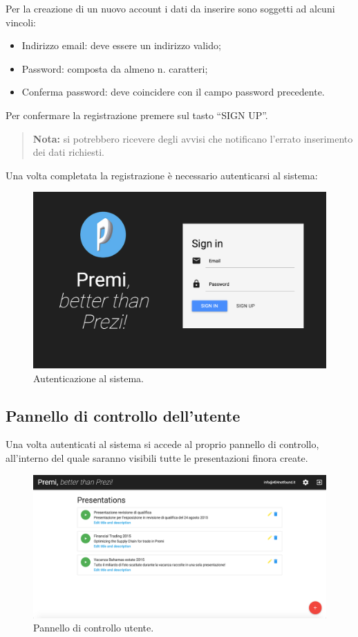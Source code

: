 Per la creazione di un nuovo account i dati da inserire sono soggetti ad alcuni vincoli:
\begin{itemize}
\item Indirizzo email: deve essere un indirizzo valido;
\item Password: composta da almeno n. caratteri;
\item Conferma password: deve coincidere con il campo password precedente.
\end{itemize}
Per confermare la registrazione premere sul tasto ``SIGN UP''.
\begin{quote}
\textbf{Nota:} si potrebbero ricevere degli avvisi che notificano l'errato inserimento dei dati richiesti.
\end{quote}
Una volta completata la registrazione è necessario autenticarsi al sistema:
\begin{figure}[h]
\begin{center}
\includegraphics[scale=0.4]{img/signin.png}
\caption{Autenticazione al sistema.}
\end{center}
\end{figure}

\newpage
\subsection{Pannello di controllo dell'utente}
Una volta autenticati al sistema si accede al proprio pannello di controllo, all'interno del quale saranno visibili tutte le presentazioni finora create.
\begin{figure}[h]
\begin{center}
\includegraphics[scale=0.35]{img/dashboard.png}
\caption{Pannello di controllo utente.}
\end{center}
\end{figure}

